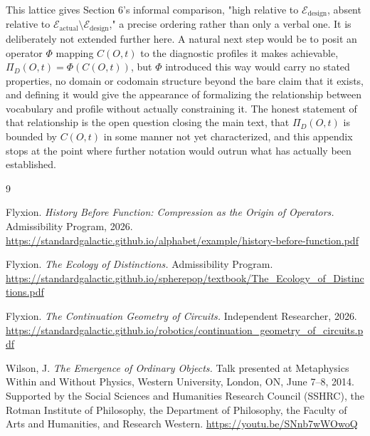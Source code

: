 \documentclass[11pt]{article}
\begin{document}
This lattice gives Section 6's informal comparison, "high relative to $\mathcal{E}_{\text{design}}$, absent relative to $\mathcal{E}_{\text{actual}} \setminus \mathcal{E}_{\text{design}}$," a precise ordering rather than only a verbal one. It is deliberately not extended further here. A natural next step would be to posit an operator $\Phi$ mapping $C(O,t)$ to the diagnostic profiles it makes achievable, $\Pi_D(O,t) = \Phi(C(O,t))$, but $\Phi$ introduced this way would carry no stated properties, no domain or codomain structure beyond the bare claim that it exists, and defining it would give the appearance of formalizing the relationship between vocabulary and profile without actually constraining it. The honest statement of that relationship is the open question closing the main text, that $\Pi_D(O,t)$ is bounded by $C(O,t)$ in some manner not yet characterized, and this appendix stops at the point where further notation would outrun what has actually been established.

\newpage
\begin{thebibliography}{9}



Flyxion.
\textit{History Before Function: Compression as the Origin of Operators.}
Admissibility Program, 2026. \url{https://standardgalactic.github.io/alphabet/example/history-before-function.pdf}

Flyxion.
\textit{The Ecology of Distinctions.}
Admissibility Program. \url{https://standardgalactic.github.io/spherepop/textbook/The_Ecology_of_Distinctions.pdf}

Flyxion.
\textit{The Continuation Geometry of Circuits.}
Independent Researcher, 2026. \url{https://standardgalactic.github.io/robotics/continuation_geometry_of_circuits.pdf}

Wilson, J.
\textit{The Emergence of Ordinary Objects.}
Talk presented at Metaphysics Within and Without Physics, Western University, London, ON, June 7--8, 2014. Supported by the Social Sciences and Humanities Research Council (SSHRC), the Rotman Institute of Philosophy, the Department of Philosophy, the Faculty of Arts and Humanities, and Research Western. \url{https://youtu.be/SNnb7wWOwoQ}

\end{thebibliography}
\end{document}

